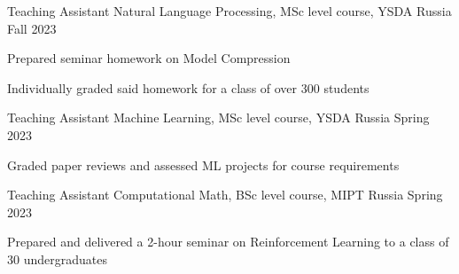 
\begin{cventries}
  \cventry
    {Teaching Assistant} %
    {Natural Language Processing, MSc level course, YSDA} %
    {Russia} %
    {Fall 2023} %
    {
      \begin{cvitems} %
        \item {Prepared seminar homework on Model Compression}
        \item {Individually graded said homework for a class of over 300 students}
      \end{cvitems}
    }

  \cventry
    {Teaching Assistant} %
    {Machine Learning, MSc level course, YSDA} %
    {Russia} %
    {Spring 2023} %
    {
      \begin{cvitems} %
        \item {Graded paper reviews and assessed ML projects for course requirements}
      \end{cvitems}
    }

  \cventry
    {Teaching Assistant} %
    {Computational Math, BSc level course, MIPT} %
    {Russia} %
    {Spring 2023} %
    {
      \begin{cvitems} %
        \item {Prepared and delivered a 2-hour seminar on Reinforcement Learning to a class of 30 undergraduates}
      \end{cvitems}
    }
    
\end{cventries}

